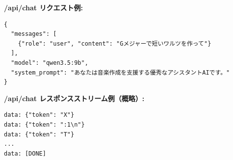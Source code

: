 \textbf{/api/chat リクエスト例:}\\
\begin{lstlisting}
{
  "messages": [
    {"role": "user", "content": "Gメジャーで短いワルツを作って"}
  ],
  "model": "qwen3.5:9b",
  "system_prompt": "あなたは音楽作成を支援する優秀なアシスタントAIです。"
}
\end{lstlisting}

\textbf{/api/chat レスポンスストリーム例（概略）:}\\
\begin{lstlisting}
data: {"token": "X"}
data: {"token": ":1\n"}
data: {"token": "T"}
...
data: [DONE]
\end{lstlisting}
